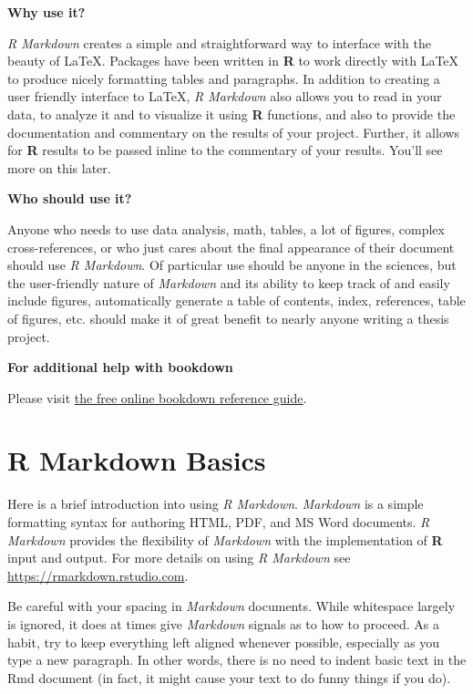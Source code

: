 \documentclass[12pt,twoside]{reedthesis}
\begin{document}
\textbf{Why use it?}

\emph{R Markdown} creates a simple and straightforward way to interface with the beauty of LaTeX. Packages have been written in \textbf{R} to work directly with LaTeX to produce nicely formatting tables and paragraphs. In addition to creating a user friendly interface to LaTeX, \emph{R Markdown} also allows you to read in your data, to analyze it and to visualize it using \textbf{R} functions, and also to provide the documentation and commentary on the results of your project. Further, it allows for \textbf{R} results to be passed inline to the commentary of your results. You'll see more on this later.

\textbf{Who should use it?}

Anyone who needs to use data analysis, math, tables, a lot of figures, complex cross-references, or who just cares about the final appearance of their document should use \emph{R Markdown}. Of particular use should be anyone in the sciences, but the user-friendly nature of \emph{Markdown} and its ability to keep track of and easily include figures, automatically generate a table of contents, index, references, table of figures, etc. should make it of great benefit to nearly anyone writing a thesis project.

\textbf{For additional help with bookdown}

Please visit \href{https://bookdown.org/yihui/bookdown/}{the free online bookdown reference guide}.

\hypertarget{rmd-basics}{%
\chapter{R Markdown Basics}\label{rmd-basics}}

Here is a brief introduction into using \emph{R Markdown}. \emph{Markdown} is a simple formatting syntax for authoring HTML, PDF, and MS Word documents. \emph{R Markdown} provides the flexibility of \emph{Markdown} with the implementation of \textbf{R} input and output. For more details on using \emph{R Markdown} see \url{https://rmarkdown.rstudio.com}.

Be careful with your spacing in \emph{Markdown} documents. While whitespace largely is ignored, it does at times give \emph{Markdown} signals as to how to proceed. As a habit, try to keep everything left aligned whenever possible, especially as you type a new paragraph. In other words, there is no need to indent basic text in the Rmd document (in fact, it might cause your text to do funny things if you do).
\end{document}
